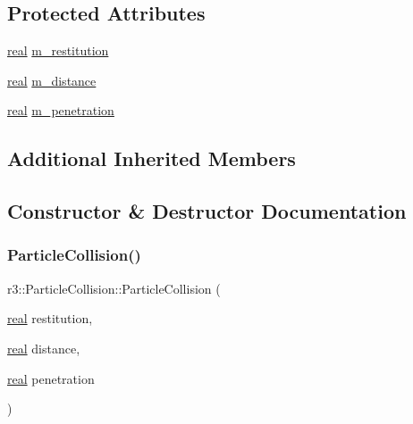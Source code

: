 \subsection*{Protected Attributes}
\begin{DoxyCompactItemize}
\item 
\mbox{\hyperlink{namespacer3_ab2016b3e3f743fb735afce242f0dc1eb}{real}} \mbox{\hyperlink{classr3_1_1_particle_collision_a02dd7e5f227a429bcb707ad46adeb292}{m\+\_\+restitution}}
\item 
\mbox{\hyperlink{namespacer3_ab2016b3e3f743fb735afce242f0dc1eb}{real}} \mbox{\hyperlink{classr3_1_1_particle_collision_a269b3beb261aee2fbd784210025cdebf}{m\+\_\+distance}}
\item 
\mbox{\hyperlink{namespacer3_ab2016b3e3f743fb735afce242f0dc1eb}{real}} \mbox{\hyperlink{classr3_1_1_particle_collision_a4e27e43b9a17e4a1d04ff91b808b4da9}{m\+\_\+penetration}}
\end{DoxyCompactItemize}
\subsection*{Additional Inherited Members}


\subsection{Constructor \& Destructor Documentation}
\mbox{\label{classr3_1_1_particle_collision_af3c52ed10e7495207bf20f3263175098}} 
\subsubsection{\texorpdfstring{Particle\+Collision()}{ParticleCollision()}}
{\footnotesize\ttfamily r3\+::\+Particle\+Collision\+::\+Particle\+Collision (\begin{DoxyParamCaption}\item[{\mbox{\hyperlink{namespacer3_ab2016b3e3f743fb735afce242f0dc1eb}{real}}}]{restitution,  }\item[{\mbox{\hyperlink{namespacer3_ab2016b3e3f743fb735afce242f0dc1eb}{real}}}]{distance,  }\item[{\mbox{\hyperlink{namespacer3_ab2016b3e3f743fb735afce242f0dc1eb}{real}}}]{penetration }\end{DoxyParamCaption})\hspace{0.3cm}{\ttfamily [explicit]}}

